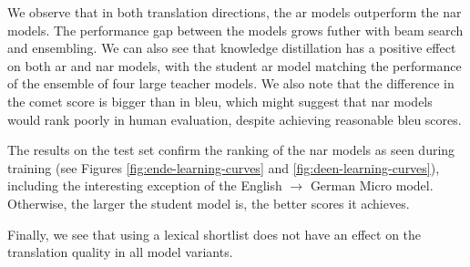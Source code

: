 We observe that in both translation directions, the \ac{ar} models outperform
the \ac{nar} models. The performance gap between the models grows futher with
beam search and ensembling. We can also see that knowledge distillation has a
positive effect on both \ac{ar} and \ac{nar} models, with the student \ac{ar}
model matching the performance of the ensemble of four large teacher models.
We also note that the difference in the \acs{comet} score is bigger than in
\acs{bleu}, which might suggest that \acs{nar} models would rank poorly in
human evaluation, despite achieving reasonable \acs{bleu} scores.


The results on the test set confirm the ranking of the \acs{nar} models as seen
during training (see Figures \ref{fig:ende-learning-curves} and
\ref{fig:deen-learning-curves}), including the interesting exception of the
English $\rightarrow$ German Micro model. Otherwise, the larger the student
model is, the better scores it achieves.

Finally, we see that using a lexical shortlist does not have an effect on the
translation quality in all model variants. 



